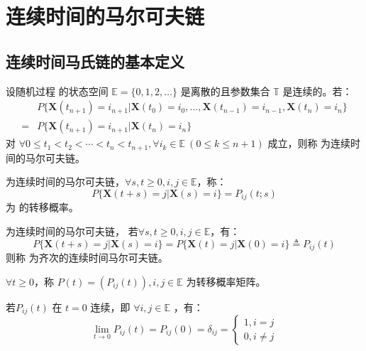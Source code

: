 \section{连续时间的马尔可夫链}
    \subsection{连续时间马氏链的基本定义}
        \begin{definition}[连续时间的马尔可夫链]
            设随机过程 \ContinuousMarkovChain 的状态空间 $ \mathbb{E} = \{0, 1, 2, \ldots \} $ 是离散的且参数集合 $\mathbb{T}$ 是连续的。若：
            \begin{align*}
                    &P\{ \textbf{X}(t_{n+1}) = i_{n + 1} | \textbf{X}(t_0) = i_0, \ldots, \textbf{X}(t_{n-1}) = i_{n - 1}, \textbf{X}(t_n) = i_n \} \\
                    = &P\{ \textbf{X}(t_{n+1}) = i_{n+1} | \textbf{X}(t_n) = i_n \}
            \end{align*}
        对 $\forall 0 \leq t_1 < t_2 < \cdots < t_n < t_{n+1}, \forall i_k \in \mathbb{E}\ (0 \leq k \leq n + 1)$ 成立，则称 \ContinuousMarkovChain 为连续时间的马尔可夫链。
        \end{definition}

        \begin{definition}[转移概率]
            \ContinuousMarkovChain 为连续时间的马尔可夫链，$\forall s, t \geq 0, i, j \in \mathbb{E}$，称：
            \[ P\{\textbf{X}(t + s) = j | \textbf{X}(s) = i\} = P_{ij}(t;s) \]
            为 \ContinuousMarkovChain 的转移概率。
        \end{definition}
            
        \begin{definition}[齐次连续时间马氏链]
            \ContinuousMarkovChain 为连续时间的马尔可夫链， 若$\forall s, t \geq 0, i, j \in \mathbb{E}$，有：
            \[ P\{\textbf{X}(t + s) = j | \textbf{X}(s) = i \} = P \{ \textbf{X}(t) = j | \textbf{X}(0) = i\} \triangleq P_{ij}(t) \]
            则称 \ContinuousMarkovChain 为齐次的连续时间马尔可夫链。 
        \end{definition}

        \begin{definition}[转移概率矩阵]
            $\forall t \geq 0$，称 $P(t) = \left( P_{ij}(t) \right), i, j \in \mathbb{E}$ 为转移概率矩阵。
        \end{definition}

        \begin{definition}[标准转移概率]
            若$P_{ij}(t)$ 在 $t=0$ 连续，即 $\forall i, j \in \mathbb{E}$ ，有：
            \[
                \lim_{t \to 0} P_{ij}(t) = P_{ij}(0) = \delta_{ij} = 
                \left\{
                \begin{array}{l}
                    1, i = j \\
                    0, i \neq j
                \end{array}
                \right.
            \]
        \end{definition}

